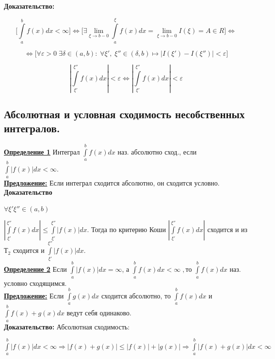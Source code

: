 \documentclass[a4paper,12pt]{article} %
\begin{document}
\textbf{Доказательство:}

$$\bigl[ \int\limits_a^{b} f(x) dx < \infty \bigr] \Longleftrightarrow \bigl[ \exists \lim\limits_{\xi \rightarrow b-0} \int\limits_a^{\xi} f(x) dx = \lim\limits_{\xi \rightarrow b-0} I(\xi) = A \in R \bigr] \Longleftrightarrow$$ 

$$ \Longleftrightarrow \bigl[\forall \varepsilon > 0\; \exists \delta \in (a, b):\; \forall \xi',\; \xi'' \in (\delta, b) \longmapsto |I(\xi') - I(\xi'')| < \varepsilon \bigr]$$

$$|\int\limits_{\xi'}^{\xi''} f(x) dx| < \varepsilon \Longleftrightarrow |\int\limits_{\xi'}^{\xi''} f(x) dx| < \varepsilon$$


\subsection{Абсолютная и условная сходимость несобственных интегралов.}

\underline{\textbf{Определение 1}} Интеграл $\int\limits_{a}^{b} f(x) dx$ наз. абсолютно сход., если $\int\limits_{a}^{b} |f(x)| dx < \infty$.\\

\underline{\textbf{Предложение:}} Если интеграл сходится абсолютно, он сходится условно.\\

\textbf{Доказательство}

$\forall \xi' \xi'' \in (a, b)$

$|\int\limits_{\xi'}^{\xi''} f(x) dx| \leq \int\limits_{\xi'}^{\xi''} |f(x)| dx$. Тогда по критерию Коши
$|\int\limits_{\xi'}^{\xi''} f(x) dx|$ сходится 
и из $Т_2$ сходится и $\int\limits_{\xi'}^{\xi''} |f(x)| dx$.\\

\underline{\textbf{Определение 2}} Если $\int\limits_{a}^{b} |f(x)| dx = \infty$, а $\int\limits_{a}^{b} f(x) dx < \infty\;  , то$ $\int\limits_{a}^{b} f(x) dx$ наз. условно сходящимся.\\

\underline{\textbf{Предложение:}} Если $\int\limits_{a}^{b} g(x) dx$ сходится абсолютно, то $\int\limits_{a}^{b} f(x) dx$ и $\int\limits_{a}^{b} f(x)+g(x) dx$ ведут себя одинаково.\\

\textbf{Доказательство:} Абсолютная сходимость:

$\int\limits_{a}^{b} |f(x)| dx < \infty \Rightarrow |f(x) +g(x)| \leq |f(x)| + |g(x)| \Rightarrow \int\limits_a^b |f(x) +g(x)| dx < \infty$ 
\end{document}

